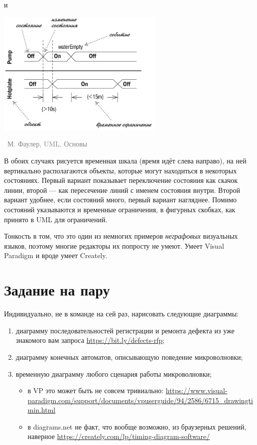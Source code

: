 \documentclass[a5paper]{article}
\newcommand{\attribution}[1] {
    \vspace{-5mm}\begin{flushright}\begin{scriptsize}\textcolor{gray}{\textcopyright\, #1}\end{scriptsize}\end{flushright}
}
\begin{document}
и

\begin{center}
    \includegraphics[width=0.6\textwidth]{timingDiagramsAlternate.png}
    \attribution{М. Фаулер, UML. Основы}
\end{center}

В обоих случаях рисуется временная шкала (время идёт слева направо), на ней вертикально располагаются объекты, которые могут находиться в некоторых состояниях. Первый вариант показывает переключение состояния как скачок линии, второй --- как пересечение линий с именем состояния внутри. Второй вариант удобнее, если состояний много, первый вариант нагляднее. Помимо состояний указываются и временные ограничения, в фигурных скобках, как принято в UML для ограничений.

Тонкость в том, что это один из немногих примеров \emph{неграфовых} визуальных языков, поэтому многие редакторы их попросту не умеют. Умеет Visual Paradigm и вроде умеет Creately.

\section{Задание на пару}

Индивидуально, не в команде на сей раз, нарисовать следующие диаграммы:

\begin{enumerate}
    \item диаграмму последовательностей регистрации и ремонта дефекта из уже знакомого вам запроса \url{https://bit.ly/defects-rfp};
    \item диаграмму конечных автоматов, описывающую поведение микроволновки;
    \item временную диаграмму любого сценария работы микроволновки;
    \begin{itemize}
        \item в VP это может быть не совсем тривиально: \url{https://www.visual-paradigm.com/support/documents/vpuserguide/94/2586/6715_drawingtimin.html}
        \item в diagrams.net не факт, что вообще возможно, из браузерных решений, наверное \url{https://creately.com/lp/timing-diagram-software/}
    \end{itemize}
\end{enumerate}
\end{document}
